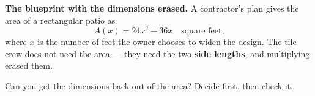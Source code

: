 \documentclass[10pt]{article}
\begin{document}
\boxguard[12]
\begin{hookbox}
\small
\textbf{The blueprint with the dimensions erased.} A contractor's plan gives the area of a
rectangular patio as
\[ A(x) = 24x^2+36x \quad \text{square feet,} \]
where $x$ is the number of feet the owner chooses to widen the design. The tile crew does not need
the area --- they need the two \textbf{side lengths}, and multiplying erased them.

Can you get the dimensions back out of the area? Decide first, then check it.

\\
\\
\end{hookbox}

\vspace{0.10in}
\end{document}
